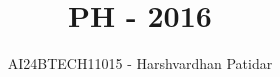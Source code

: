 \documentclass[journal]{IEEEtran}
\begin{document}

\vspace{3cm}

\title{PH - 2016}
\author{AI24BTECH11015 - Harshvardhan Patidar}
 \maketitle
{\let\newpage\relax\maketitle}

\renewcommand{\thefigure}{\theenumi}
\renewcommand{\thetable}{\theenumi}
\setlength{\intextsep}{10pt} %


\renewcommand{\thetable}{\theenumi}
\end{document}

